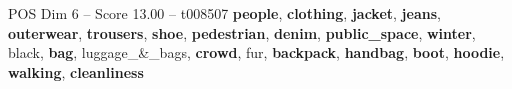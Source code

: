 \begin{textsample}{POS Dim 6 – Score 13.00 – t008507}  \label{ex:f6_pos_016}
\textbf{people}, \textbf{clothing}, \textbf{jacket}, \textbf{jeans}, \textbf{outerwear}, \textbf{trousers}, \textbf{shoe}, \textbf{pedestrian}, \textbf{denim}, \textbf{public\_space}, \textbf{winter}, black, \textbf{bag}, luggage\_\&\_bags, \textbf{crowd}, fur, \textbf{backpack}, \textbf{handbag}, \textbf{boot}, \textbf{hoodie}, \textbf{walking}, \textbf{cleanliness}

\end{textsample}
